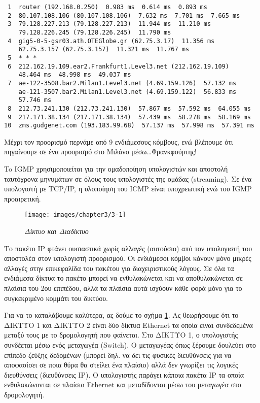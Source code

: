 \begin{inthebox}
\begin{verbatim}
 1  router (192.168.0.250)  0.983 ms  0.614 ms  0.893 ms
 2  80.107.108.106 (80.107.108.106)  7.632 ms  7.701 ms  7.665 ms
 3  79.128.227.213 (79.128.227.213)  11.944 ms  11.210 ms
    79.128.226.245 (79.128.226.245)  11.790 ms
 4  gig5-0-5-gsr03.ath.OTEGlobe.gr (62.75.3.17)  11.356 ms
    62.75.3.157 (62.75.3.157)  11.321 ms  11.767 ms
 5  * * *
 6  212.162.19.109.ear2.Frankfurt1.Level3.net (212.162.19.109) 
    48.464 ms  48.998 ms  49.037 ms
 7  ae-122-3508.bar2.Milan1.Level3.net (4.69.159.126)  57.132 ms
    ae-121-3507.bar2.Milan1.Level3.net (4.69.159.122)  56.833 ms  
    57.746 ms
 8  212.73.241.130 (212.73.241.130)  57.867 ms  57.592 ms  64.055 ms
 9  217.171.38.134 (217.171.38.134)  57.439 ms  58.278 ms  58.169 ms
10  zms.gudgenet.com (193.183.99.68)  57.137 ms  57.998 ms  57.391 ms
\end{verbatim}
\normalsize
Μέχρι τον προορισμό περνάμε από 9 ενδιάμεσους κόμβους, ενώ βλέπουμε ότι πηγαίνουμε σε ένα προορισμό στο Μιλάνο μέσω\ldots Φρανκφούρτης!\\
\end{inthebox}

To IGMP χρησιμοποιείται για την ομαδοποίηση υπολογιστών και αποστολή ταυτόχρονα μηνυμάτων σε όλους τους υπολογιστές της ομάδας (streaming). Σε ένα υπολογιστή με TCP/IP, η υλοποίηση του ICMP είναι υποχρεωτική ενώ του IGMP προαιρετική.

\begin{figure}[!ht]
  \centering
  \texttt{[image: images/chapter3/3-1]}
  \caption {\textsl{Δίκτυο και Διαδίκτυο}}
  \label{3-1}
\end{figure}

Το πακέτο IP φτάνει ουσιαστικά χωρίς αλλαγές (αυτούσιο) από τον υπολογιστή του αποστολέα στον υπολογιστή προορισμού. Οι ενδιάμεσοι κόμβοι κάνουν μόνο μικρές αλλαγές στην επικεφαλίδα του πακέτου για διαχειριστικούς λόγους. Σε όλα τα ενδιάμεσα δίκτυα το πακέτο μπορεί να ενθυλακώνεται και να αποθυλακώνεται σε πλαίσια του 2ου επιπέδου, αλλά τα πλαίσια αυτά ισχύουν κάθε φορά μόνο για το συγκεκριμένο κομμάτι του δικτύου.

Για να το καταλάβουμε καλύτερα, ας δούμε το σχήμα \ref{3-1}. Ας θεωρήσουμε ότι το ΔΙΚΤΥΟ 1 και ΔΙΚΤΥΟ 2 είναι δύο δίκτυα Ethernet τα οποία ειναι συνδεδεμένα μεταξύ τους με το δρομολογητή που φαίνεται.  Στο ΔΙΚΤΥΟ 1, ο υπολογιστής συνδέεται μέσω ενός μεταγωγέα (Switch). Ο μεταγωγέας όπως ξέρουμε δουλεύει στο επίπεδο ζεύξης δεδομένων (μπορεί δηλ. να δει τις φυσικές διευθύνσεις για να αποφασίσει σε ποια θύρα θα στείλει ένα πλαίσιο) αλλά δεν γνωρίζει τις λογικές διευθύνσεις (διευθύνσεις IP). Ο υπολογιστής παράγει κάποια πακέτα IP τα οποία ενθυλακώνονται σε πλαίσια Ethernet και μεταδίδονται μέσω του μεταγωγέα στο δρομολογητή.

